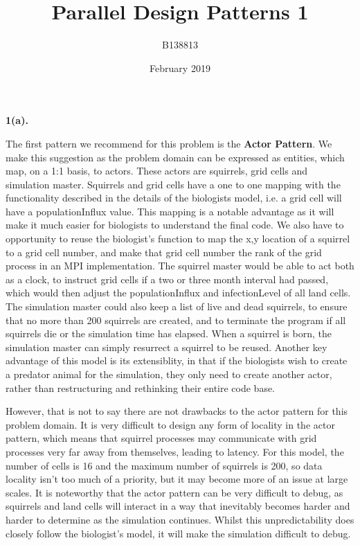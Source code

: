 \documentclass{article}
\title{Parallel Design Patterns 1}
\author{B138813}
\date{February 2019}
\begin{document}
\noindent\textbf{1(a).} \newline

The first pattern we recommend for this problem is the \textbf{Actor Pattern}. We make this suggestion as the problem domain can be expressed as entities, which map, on a 1:1 basis, to actors. These actors are squirrels, grid cells and simulation master. Squirrels and grid cells have a one to one mapping with the functionality described in the details of the biologists model, i.e. a grid cell will have a populationInflux value. This mapping is a notable advantage as it will make it much easier for biologists to understand the final code. We also have to opportunity to reuse the biologist's function to map the x,y location of a squirrel to a grid cell number, and make that grid cell number the rank of the grid process in an MPI implementation. The squirrel master would be able to act both as a clock, to instruct grid cells if a two or three month interval had passed, which would then adjust the populationInflux and infectionLevel of all land cells. The simulation master could also keep a list of live and dead squirrels, to ensure that no more than 200 squirrels are created, and to terminate the program if all squirrels die or the simulation time has elapsed. When a squirrel is born, the simulation master can simply resurrect a squirrel to be reused. Another key advantage of this model is its extensiblity, in that if the biologists wish to create a predator animal for the simulation, they only need to create another actor, rather than restructuring and rethinking their entire code base.

However, that is not to say there are not drawbacks to the actor pattern for this problem domain. It is very difficult to design any form of locality in the actor pattern, which means that squirrel processes may communicate with grid processes very far away from themselves, leading to latency. For this model, the number of cells is 16 and the maximum number of squirrels is 200, so data locality isn't too much of a priority, but it may become more of an issue at large scales. It is noteworthy that the actor pattern can be very difficult to debug, as squirrels and land cells will interact in a way that inevitably becomes harder and harder to determine as the simulation continues. Whilst this unpredictability does closely follow the biologist's model, it will make the simulation difficult to debug.
\end{document}
